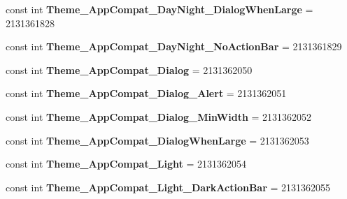 \begin{DoxyCompactItemize}
const int {\bfseries Theme\+\_\+\+App\+Compat\+\_\+\+Day\+Night\+\_\+\+Dialog\+When\+Large} = 2131361828
\item 
\mbox{\label{class_sample_app_1_1_droid_1_1_resource_1_1_style_a1fd60fa2742e238b2780b727d2afdc93}} 
const int {\bfseries Theme\+\_\+\+App\+Compat\+\_\+\+Day\+Night\+\_\+\+No\+Action\+Bar} = 2131361829
\item 
\mbox{\label{class_sample_app_1_1_droid_1_1_resource_1_1_style_af2b9e2ed257c29b401270a53e7d76239}} 
const int {\bfseries Theme\+\_\+\+App\+Compat\+\_\+\+Dialog} = 2131362050
\item 
\mbox{\label{class_sample_app_1_1_droid_1_1_resource_1_1_style_a6753a7f4a3111e9747d303f6b62028c4}} 
const int {\bfseries Theme\+\_\+\+App\+Compat\+\_\+\+Dialog\+\_\+\+Alert} = 2131362051
\item 
\mbox{\label{class_sample_app_1_1_droid_1_1_resource_1_1_style_af823fc0b0bd778bd05fd61e3f155ec08}} 
const int {\bfseries Theme\+\_\+\+App\+Compat\+\_\+\+Dialog\+\_\+\+Min\+Width} = 2131362052
\item 
\mbox{\label{class_sample_app_1_1_droid_1_1_resource_1_1_style_a734c1967b1c2d0732a0e388c3fd09a94}} 
const int {\bfseries Theme\+\_\+\+App\+Compat\+\_\+\+Dialog\+When\+Large} = 2131362053
\item 
\mbox{\label{class_sample_app_1_1_droid_1_1_resource_1_1_style_a97373369e4649eff47f967934709cdbe}} 
const int {\bfseries Theme\+\_\+\+App\+Compat\+\_\+\+Light} = 2131362054
\item 
\mbox{\label{class_sample_app_1_1_droid_1_1_resource_1_1_style_a59f5a75ed3b13aa7ccf7a8d9fe03c4ac}} 
const int {\bfseries Theme\+\_\+\+App\+Compat\+\_\+\+Light\+\_\+\+Dark\+Action\+Bar} = 2131362055
\item 
\mbox{\label{class_sample_app_1_1_droid_1_1_resource_1_1_style_a28ec3c2a131e74320b2dad74a2c4f528}} 

\end{DoxyCompactItemize}
